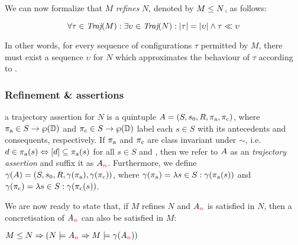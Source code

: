 

We can now formalize that $M$ \textit{refines} $N$, denoted by $M \leq N$, as follows:

\begin{equation*}
\forall \tau \in \operatorname{\textit{Traj}}(M) : \exists \upsilon \in \operatorname{\textit{Traj}}(N) : | \tau | = | \upsilon | \wedge \tau \ll \upsilon
\end{equation*}

\noindent In other words, for every sequence of configurations $\tau$ permitted by $M$, there must exist a sequence $\upsilon$ for $N$ which approximates the behaviour of $\tau$ according to . 

\subsubsection{Refinement \& assertions}

 a trajectory assertion for $N$ is a quintuple $A = (S, s_{0}, R, \operatorname{\pi_{\textrm{a}}}, \operatorname{\pi_{\textrm{c}}})$, where $\operatorname{\pi_{\textrm{a}}} \in S \rightarrow \wp(\mathbb{D})$ and $\operatorname{\pi_{\textrm{c}}} \in S \rightarrow \wp(\mathbb{D})$ label each $s \in S$ with its antecedents and consequents, respectively. If $\operatorname{\pi_{\textrm{a}}}$ and $\operatorname{\pi_{\textrm{c}}}$ are class invariant under $\sim$, i.e. $d \in \operatorname{\pi_{\textrm{a}}}(s) \Leftrightarrow [d] \subseteq \operatorname{\pi_{\textrm{a}}}(s)$ for all $s \in S$ and , then we refer to $A$ as an \textit{ trajectory assertion} and suffix it as $A_{\textcolor{red}{n}}$. Furthermore, we define $\gamma(A) = (S, s_{0}, R, \gamma(\operatorname{\pi_{\textrm{a}}}), \gamma(\operatorname{\pi_{\textrm{c}}}))$, where $\gamma(\operatorname{\pi_{\textrm{a}}}) = \lambda s \in S : \gamma(\operatorname{\pi_{\textrm{a}}}(s))$ and $\gamma(\operatorname{\pi_{\textrm{c}}}) = \lambda s \in S : \gamma(\operatorname{\pi_{\textrm{c}}}(s))$.



We are now ready to state that, if $M$ refines $N$ and $A_{\textcolor{red}{n}}$ is satisfied in $N$, then a concretisation of $A_{\textcolor{red}{n}}$ can also be satisfied in $M$:

\begin{theorem} \label{thm:traj-refines}
$M \leq N \Rightarrow (N \models A_{\textcolor{red}{n}} \Rightarrow M \models \gamma(A_{\textcolor{red}{n}}))$
\end{theorem}

